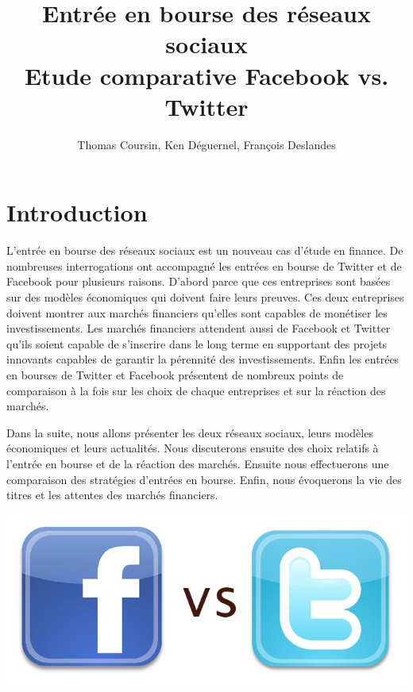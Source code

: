 \documentclass[a4paper,10pt]{article}
\author{Thomas Coursin, Ken Déguernel, François Deslandes}
\affil{Génie Mathématique 5ème année}
\affil{A l'attention de Mme Lehmann}
\title{\Huge{Entrée en bourse des réseaux sociaux}\\
\LARGE{Etude comparative Facebook vs. Twitter}\\
\vspace{10mm}
}
\begin{document}
\maketitle\thispagestyle{empty}
 
\newpage\null\thispagestyle{empty}\setcounter{page}{0}

\tableofcontents

\clearpage



\section{Introduction}

L'entrée en bourse des réseaux sociaux est un nouveau cas d'étude en finance. De nombreuses interrogations ont accompagné les entrées en bourse de Twitter et de Facebook pour plusieurs raisons.
D'abord parce que ces entreprises sont basées sur des modèles économiques qui doivent faire leurs preuves. Ces deux entreprises doivent montrer aux marchés financiers qu'elles sont capables de monétiser les investissements.
Les marchés financiers attendent aussi de Facebook et Twitter qu'ils soient capable de s'inscrire dans le long terme en supportant des projets innovants capables de garantir la pérennité des investissements.
Enfin les entrées en bourses de Twitter et Facebook présentent de nombreux points de comparaison à la fois sur les choix de chaque entreprises et sur la réaction des marchés.


Dans la suite, nous allons présenter les deux réseaux sociaux, leurs modèles économiques et leurs actualités. Nous discuterons ensuite des choix relatifs à l'entrée en bourse et de la réaction des marchés. Ensuite nous effectuerons une comparaison des stratégies d'entrées en bourse. Enfin, nous évoquerons la vie des titres et les attentes des marchés financiers.

\vspace{1cm}
\begin{center}
\includegraphics[scale=0.3]{./images/facebook_vs_twitter.png}
\end{center}
\end{document}
